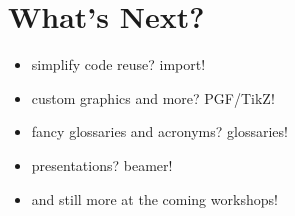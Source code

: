 \documentclass[hidelinks, 12pt]{article}%
\begin{document}
    \section{What's Next?}
        \begin{itemize}
            \item simplify code reuse? import!
            \item custom graphics and more? PGF/TikZ!
            \item fancy glossaries and acronyms? glossaries!
            \item presentations? beamer!
            \item and still more at the coming workshops!
        \end{itemize}
    \clearpage
    \printbibliography[heading=bibintoc]
\end{document}
